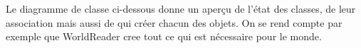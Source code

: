 Le diagramme de classe ci-dessous donne un aperçu de l'état des classes, de leur association mais aussi de qui créer chacun des objets.
\ml
On se rend compte par exemple que WorldReader cree tout ce qui est nécessaire pour le monde.

